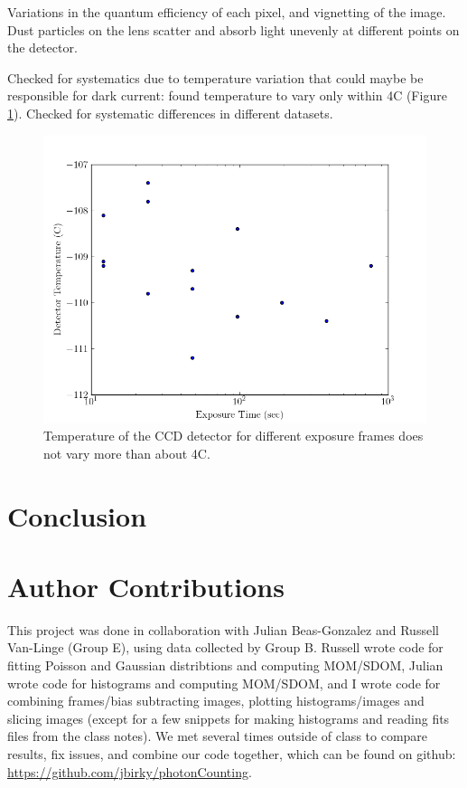 \documentclass[preprint]{aastex62}
\begin{document}
Variations in the quantum efficiency of each pixel, and vignetting of the image.
Dust particles on the lens scatter and absorb light unevenly at different points on the detector.

Checked for systematics due to temperature variation that could maybe be responsible for dark current: found temperature to vary only within 4C (Figure \ref{fig:temp}). Checked for systematic differences in different datasets. 

\begin{figure}[H]
\begin{center}
\includegraphics[width=.48\linewidth]{plots/exposure_temp.png}
\caption{Temperature of the CCD detector for different exposure frames does not vary more than about 4C.} \label{fig:temp}
\end{center}
\end{figure}

\section{Conclusion}


\section{Author Contributions}

This project was done in collaboration with Julian Beas-Gonzalez and Russell Van-Linge (Group E), using data collected by Group B. Russell wrote code for fitting Poisson and Gaussian distribtions and computing MOM/SDOM, Julian wrote code for histograms and computing MOM/SDOM, and I wrote code for combining frames/bias subtracting images, plotting histograms/images and slicing images (except for a few snippets for making histograms and reading fits files from the class notes). We met several times outside of class to compare results, fix issues, and combine our code together, which can be found on github: \href{https://github.com/jbirky/photonCounting}{https://github.com/jbirky/photonCounting}.
\end{document}
